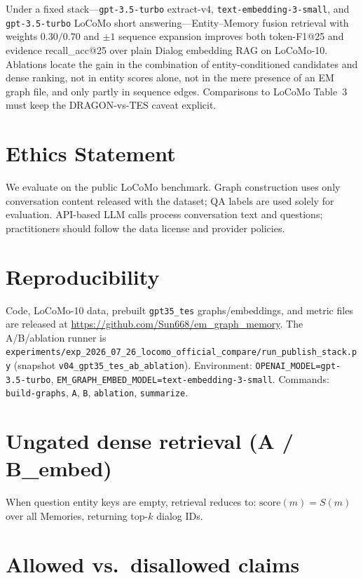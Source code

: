 \documentclass[11pt]{article}
\begin{document}
Under a fixed stack---\texttt{gpt-3.5-turbo} extract-v4, \texttt{text-embedding-3-small}, and \texttt{gpt-3.5-turbo} LoCoMo short answering---Entity--Memory fusion retrieval with weights $0.30/0.70$ and $\pm 1$ sequence expansion improves both token-F1@25 and evidence recall\_acc@25 over plain Dialog embedding RAG on LoCoMo-10.
Ablations locate the gain in the combination of entity-conditioned candidates and dense ranking, not in entity scores alone, not in the mere presence of an EM graph file, and only partly in sequence edges.
Comparisons to LoCoMo Table~3 must keep the DRAGON-vs-TES caveat explicit.

\section*{Ethics Statement}
We evaluate on the public LoCoMo benchmark.
Graph construction uses only conversation content released with the dataset; QA labels are used solely for evaluation.
API-based LLM calls process conversation text and questions; practitioners should follow the data license and provider policies.

\section*{Reproducibility}
Code, LoCoMo-10 data, prebuilt \texttt{gpt35\_tes} graphs/embeddings, and metric
files are released at
\url{https://github.com/Sun668/em_graph_memory}.
The A/B/ablation runner is
\texttt{experiments/exp\_2026\_07\_26\_locomo\_official\_compare/run\_publish\_stack.py}
(snapshot \texttt{v04\_gpt35\_tes\_ab\_ablation}).
Environment: \texttt{OPENAI\_MODEL=gpt-3.5-turbo},
\texttt{EM\_GRAPH\_EMBED\_MODEL=text-embedding-3-small}.
Commands: \texttt{build-graphs}, \texttt{A}, \texttt{B}, \texttt{ablation}, \texttt{summarize}.




\appendix
\section{Ungated dense retrieval (A / B\_embed)}
\label{app:ungated}
When question entity keys are empty, retrieval reduces to:
$\mathrm{score}(m)=S(m)$ over all Memories, returning top-$k$ dialog IDs.

\section{Allowed vs.\ disallowed claims}
\label{app:claims}
\end{document}
